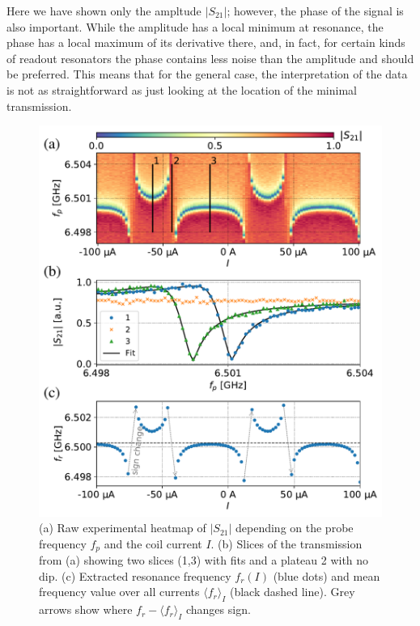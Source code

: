 \documentclass[%
 aip,
 draft,
 amsmath,amssymb,
 reprint,%
]{revtex4-1}
\begin{document}
Here we have shown only the ampltude $|S_{21}|$; however, the phase of the signal is also important. While the amplitude has a local minimum at resonance, the phase has a local maximum of its derivative there, and, in fact, for certain kinds of readout resonators the phase contains less noise than the amplitude and should be preferred. This means that for the general case, the interpretation of the data is not as straightforward as just looking at the location of the minimal transmission.

\begin{figure}
\includegraphics[width=\linewidth]{anti_subplots}
\caption{(a) Raw experimental heatmap of $|S_{21}|$ depending on the probe frequency $f_p$ and the coil current $I$. (b) Slices of the transmission from (a) showing two slices (1,3) with fits and a plateau 2 with no dip. (c) Extracted resonance frequency $f_r(I)$ (blue dots) and mean frequency value over all currents $\langle f_r \rangle_{I}$ (black dashed line). Grey arrows show where $f_r - \langle f_r \rangle_{I}$ changes sign.}
\label{fig:anti_exp}
\end{figure}
\end{document}
